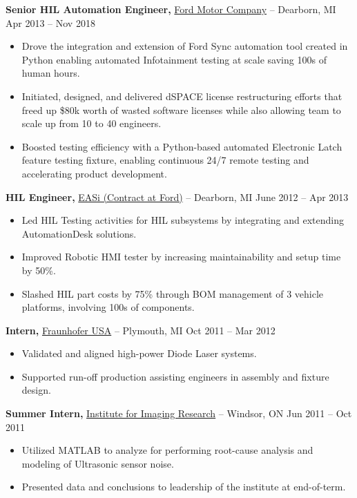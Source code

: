 \documentclass[11pt]{article}       %
\begin{document}
\textbf{Senior HIL Automation Engineer,} \href{}{Ford Motor Company} -- Dearborn, MI \hfill Apr 2013 -- Nov 2018 \\
\vspace{-9pt}
\begin{itemize}
  \item Drove the integration and extension of Ford Sync automation tool created in Python enabling automated Infotainment testing at scale saving 100s of human hours.
  \item Initiated, designed, and delivered dSPACE license restructuring efforts that freed up \$80k worth of wasted software licenses while also allowing team to scale up from 10 to 40 engineers.
  \item Boosted testing efficiency with a Python-based automated Electronic Latch feature testing fixture, enabling continuous 24/7 remote testing and accelerating product development.
\end{itemize}

\textbf{HIL Engineer,} \href{}{EASi (Contract at Ford)} -- Dearborn, MI \hfill June 2012 -- Apr 2013 \\
\vspace{-9pt}
\begin{itemize}
  \item Led HIL Testing activities for HIL subsystems by integrating and extending AutomationDesk solutions.
  \item Improved Robotic HMI tester by increasing maintainability and setup time by 50\%.
  \item Slashed HIL part costs by 75\% through BOM management of 3 vehicle platforms, involving 100s of components.
\end{itemize}

\textbf{Intern,} \href{}{Fraunhofer USA} -- Plymouth, MI \hfill Oct 2011 -- Mar 2012 \\
\vspace{-9pt}
\begin{itemize}
  \item Validated and aligned high-power Diode Laser systems.
  \item Supported run-off production assisting engineers in assembly and fixture design.
\end{itemize}

\textbf{Summer Intern,} \href{}{Institute for Imaging Research} -- Windsor, ON \hfill Jun 2011 -- Oct 2011 \\
\vspace{-9pt}
\begin{itemize}
  \item Utilized MATLAB to analyze for performing root-cause analysis and modeling of Ultrasonic sensor noise.
  \item Presented data and conclusions to leadership of the institute at end-of-term.
\end{itemize}
\end{document}
